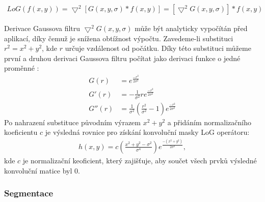 \begin{align}
\label{eq:LoG1}
LoG \left (f \left (x,y \right ) \right )=
\bigtriangledown^2\left [ G(x,y,\sigma)\ast f(x,y) \right ] = 
\left [\bigtriangledown^2G(x,y,\sigma) \right ] \ast f(x,y)
\end{align}

Derivace Gaussova filtru $\bigtriangledown^2G(x,y,\sigma)$ může být analyticky vypočítán před aplikací, díky čemuž je snížena obtížnost výpočtu. Zavedeme-li substituci $r^2=x^2+y^2$, kde $r$ určuje vzdálenost od počátku. Díky této substituci můžeme první a druhou derivaci Gaussova filtru počítat jako derivaci funkce o jedné proměnné \cite[str.~140]{Image-Processing-Analysis-and-Machine-Vision}:
\begin{align}
\label{eq:LoG2}
G(r)    &=e^{\frac{-r^2}{2\sigma^2}} \\
G{}'(r) &= -\frac{1}{\sigma^2} r e^{\frac{-r^2}{2\sigma^2}} \\
G{}''(r)&= \frac{1}{\sigma^2} \left ( \frac{r^2}{\sigma^2} - 1 \right ) e^{\frac{-r^2}{2\sigma^2}} 
\end{align}
Po nahrazení substituce původním výrazem $x^2 + y^2$ a přidáním normalizačního koeficientu $c$ je výsledná rovnice pro získání konvoluční masky LoG operátoru:
\begin{align}
\label{eq:LoG2_1}
h\left ( x,y \right )=c \left ( \frac{x^2+y^2-\sigma^2}{\sigma^4} \right ) e^{\frac{-(x^2+y^2)}{2\sigma^2}}, 
\end{align}
kde $c$ je normalizační keoficient, který zajišťuje, aby součet všech prvků výsledné konvoluční matice byl 0. \cite[str.~140]{Image-Processing-Analysis-and-Machine-Vision}

\subsubsection{Segmentace}
